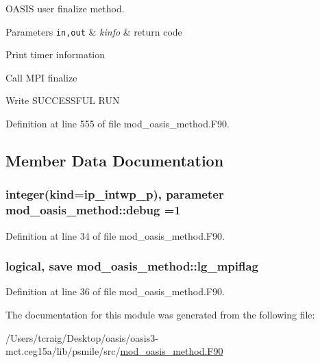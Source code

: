 O\+A\+S\+I\+S user finalize method. 


\begin{DoxyParams}[1]{Parameters}
\mbox{\tt in,out}  & {\em kinfo} & return code \\
\hline
\end{DoxyParams}

\begin{DoxyItemize}
\item Print timer information
\item Call M\+P\+I finalize
\item Write S\+U\+C\+C\+E\+S\+S\+F\+U\+L R\+U\+N 
\end{DoxyItemize}

Definition at line 555 of file mod\+\_\+oasis\+\_\+method.\+F90.



\subsection{Member Data Documentation}
\hypertarget{classmod__oasis__method_a390290b92b6af57b2732cb7521532f1c}{
\subsubsection[{debug}]{\setlength{\rightskip}{0pt plus 5cm}integer(kind=ip\+\_\+intwp\+\_\+p), parameter mod\+\_\+oasis\+\_\+method\+::debug =1\hspace{0.3cm}{\ttfamily [private]}}}\label{classmod__oasis__method_a390290b92b6af57b2732cb7521532f1c}


Definition at line 34 of file mod\+\_\+oasis\+\_\+method.\+F90.

\hypertarget{classmod__oasis__method_a2d387aae5e884be0aa69d640a7d3b49f}{
\subsubsection[{lg\+\_\+mpiflag}]{\setlength{\rightskip}{0pt plus 5cm}logical, save mod\+\_\+oasis\+\_\+method\+::lg\+\_\+mpiflag\hspace{0.3cm}{\ttfamily [private]}}}\label{classmod__oasis__method_a2d387aae5e884be0aa69d640a7d3b49f}


Definition at line 36 of file mod\+\_\+oasis\+\_\+method.\+F90.



The documentation for this module was generated from the following file\+:\begin{DoxyCompactItemize}
\item 
/\+Users/tcraig/\+Desktop/oasis/oasis3-\/mct.\+ceg15a/lib/psmile/src/\hyperlink{mod__oasis__method_8_f90}{mod\+\_\+oasis\+\_\+method.\+F90}\end{DoxyCompactItemize}
